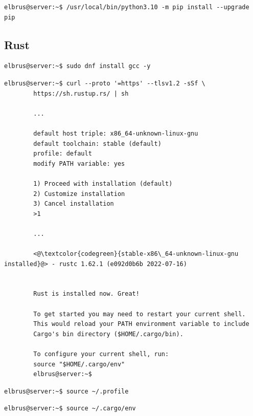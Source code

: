 \documentclass{article}
\begin{document}
	\lstset{style=commands}
	\begin{lstlisting}[caption={Upgraden von 'pip'.}]
		elbrus@server:~$ /usr/local/bin/python3.10 -m pip install --upgrade pip
	\end{lstlisting}

	\subsection{Rust}
	
	\lstset{style=commands}
	\begin{lstlisting}[caption={Installieren von GNU Compiler Collection.}]
		elbrus@server:~$ sudo dnf install gcc -y
	\end{lstlisting}
	
	\lstset{style=commands}
	\begin{lstlisting}[caption={Installieren von Rust.}]
		elbrus@server:~$ curl --proto '=https' --tlsv1.2 -sSf \
		https://sh.rustup.rs/ | sh
		 
		...
		 
		default host triple: x86_64-unknown-linux-gnu
		default toolchain: stable (default)
		profile: default
		modify PATH variable: yes
		
		1) Proceed with installation (default)
		2) Customize installation
		3) Cancel installation
		>1
		
		...
		
		<@\textcolor{codegreen}{stable-x86\_64-unknown-linux-gnu installed}@> - rustc 1.62.1 (e092d0b6b 2022-07-16)
		
		
		Rust is installed now. Great!
		
		To get started you may need to restart your current shell.
		This would reload your PATH environment variable to include
		Cargo's bin directory ($HOME/.cargo/bin).
		
		To configure your current shell, run:
		source "$HOME/.cargo/env"
		elbrus@server:~$
	\end{lstlisting}
	
	\lstset{style=commands}
	\begin{lstlisting}[caption={Laden der Variablen aus dem Terminal Profil.}]
		elbrus@server:~$ source ~/.profile
	\end{lstlisting}

	\lstset{style=commands}
	\begin{lstlisting}[caption={Hinzufügen des Befehls Cargo zu dem Pfad.}]
		elbrus@server:~$ source ~/.cargo/env
	\end{lstlisting}
	\newpage
	
\end{document}
